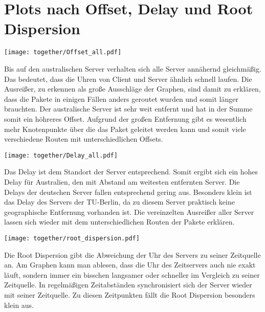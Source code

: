 \documentclass[a4paper, 11pt, fleqn, notitlepage, egregdoesnotlikesansseriftitles]{scrartcl}
\begin{document}
\newpage
\section*{Plots nach Offset, Delay und Root Dispersion}
\vspace{-\baselineskip}

\begin{center}
    \texttt{[image: together/Offset\_all.pdf]}
    \label{fig:offset}
\end{center}

Bis auf den australischen Server verhalten sich alle Server annähernd gleichmäßig. Das bedeutet, dass die Uhren von Client und Server ähnlich schnell laufen. Die Ausreißer, zu erkennen als große Ausschläge der Graphen, sind damit zu erklären, dass die Pakete in einigen Fällen anders geroutet wurden und somit länger brauchten. Der australische Server ist sehr weit entfernt und hat in der Summe somit ein höhreres Offset. Aufgrund der großen Entfernung gibt es wesentlich mehr Knotenpunkte über die das Paket geleitet werden kann und somit viele verschiedene Routen mit unterschiedlichen Offsets.

\begin{center}
    \texttt{[image: together/Delay\_all.pdf]}
    \label{fig:delay}
\end{center}

Das Delay ist dem Standort der Server entsprechend. Somit ergibt sich ein hohes Delay für Australien, den mit Abstand am weitesten entfernten Server. Die Delays der deutschen Server fallen entsprechend gering aus. Besonders klein ist das Delay des Servers der TU-Berlin, da zu diesem Server praktisch keine geographische Entfernung vorhanden ist. Die vereinzelten Ausreißer aller Server lassen sich wieder mit dem unterschiedlichen Routen der Pakete erklären.

\begin{center}
    \texttt{[image: together/root\_dispersion.pdf]}
    \label{fig:disp}
\end{center}

Die Root Dispersion gibt die Abweichung der Uhr des Servers zu seiner Zeitquelle an. Am Graphen kann man ablesen, dass die Uhr des Zeitservers auch nie exakt läuft, sondern immer ein bisschen langsamer oder schneller im Vergleich zu seiner Zeitquelle. In regelmäßigen Zeitabständen synchronisiert sich der Server wieder mit seiner Zeitquelle. Zu diesen Zeitpunkten fällt die Root Dispersion besonders klein aus.
\end{document}
